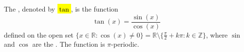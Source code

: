 \begin{definition} \label{definition:tangent_function_on_real_line}
The , denoted by \hl{$\tan$}, is the function
$$\tan(x) = \frac{\sin(x)}{\cos(x)}$$
defined on the open set $\{x \in \mathbb{R} : \cos(x) \neq 0\} = \mathbb{R} \setminus \{\frac{\pi}{2} + k\pi : k \in \mathbb{Z}\}$, where $\sin$ and $\cos$ are the . The function is $\pi$-periodic.
\end{definition}
